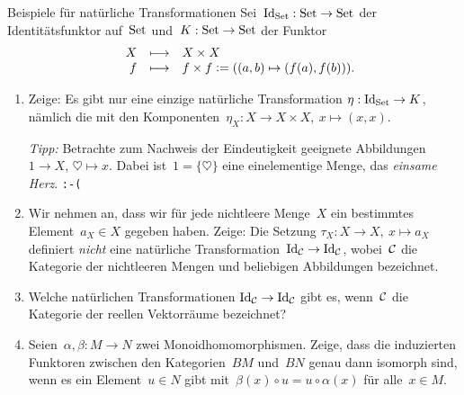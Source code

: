 \documentclass{uebblatt}
\begin{document}

\begin{aufgabe}{Beispiele für natürliche Transformationen}
Sei~$\mathrm{Id}_{\mathrm{Set}} : \mathrm{Set} \to \mathrm{Set}$ der Identitätsfunktor auf~$\mathrm{Set}$ und~$K : \mathrm{Set}
\to \mathrm{Set}$ der Funktor
\[ \begin{array}{@{}rrcl@{}}
  & X &\longmapsto& X \times X \\
  & f &\longmapsto& f \times f \defeq ((a,b) \mapsto (f(a),f(b))).
\end{array} \]
\begin{enumerate}
\item Zeige: Es gibt nur eine einzige natürliche Transformation $\eta : \mathrm{Id}_{\mathrm{Set}}
\to K$, nämlich die mit den Komponenten~$\eta_X : X \to X \times X,\ x \mapsto (x,x)$.

{\tiny
\emph{Tipp:} Betrachte zum Nachweis der Eindeutigkeit geeignete Abbildungen $1 \to X$, $\heartsuit
\mapsto x$. Dabei ist~$1 = \{\heartsuit\}$ eine einelementige Menge, das
\emph{einsame Herz}. \texttt{:-(}\par}
\item Wir nehmen an, dass wir für jede nichtleere Menge~$X$ ein bestimmtes
Element~$a_X \in X$ gegeben haben. Zeige:
Die Setzung
$\tau_X : X \to X,\ x \mapsto a_X$
definiert \emph{nicht} eine natürliche Transformation~$\mathrm{Id}_{\mathcal{C}} \to \mathrm{Id}_{\mathcal{C}}$,
wobei~$\mathcal{C}$ die Kategorie der nichtleeren Mengen und beliebigen Abbildungen
bezeichnet.
\item
Welche natürlichen Transformationen $\mathrm{Id}_{\mathcal{C}} \to \mathrm{Id}_{\mathcal{C}}$ gibt es,
wenn~$\mathcal{C}$ die Kategorie der reellen Vektorräume bezeichnet?
\item Seien~$\alpha, \beta : M \to N$ zwei Monoidhomomorphismen. Zeige, dass
die induzierten Funktoren zwischen den Kategorien~$BM$ und~$BN$ genau dann
isomorph sind, wenn es ein Element~$u \in N$ gibt mit~$\beta(x) \circ u = u
\circ \alpha(x)$ für alle~$x \in M$.
\end{enumerate}
\end{aufgabe}
\end{document}
